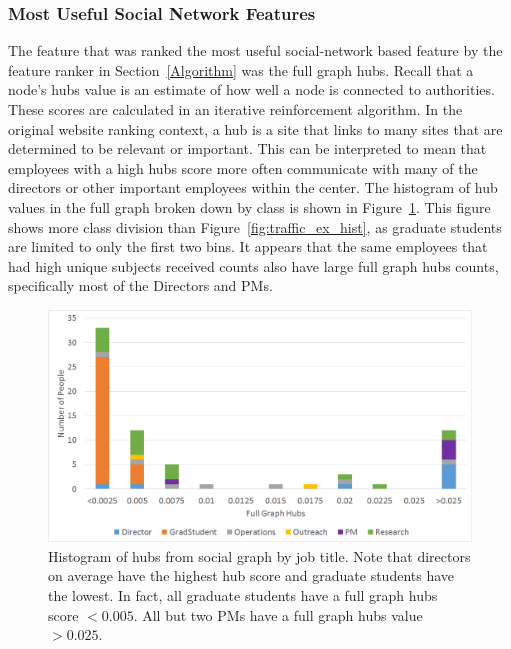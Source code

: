 \documentclass[12pt]{report}
\begin{document}
\subsubsection{Most Useful Social Network Features}
The feature that was ranked the most useful social-network based feature by the feature ranker in Section~\ref{Algorithm} was the full graph hubs.
Recall that a node's hubs value is an estimate of how well a node is connected to authorities.
These scores are calculated in an iterative reinforcement algorithm.
In the original website ranking context, a hub is a site that links to many sites that are determined to be relevant or important.
This can be interpreted to mean that employees with a high hubs score more often communicate with many of the directors or other important employees within the center.
The histogram of hub values in the full graph broken down by class is shown in Figure~\ref{fig:social_ex_hist}.
This figure shows more class division than Figure~\ref{fig:traffic_ex_hist}, as graduate students are limited to only the first two bins.
It appears that the same employees that had high unique subjects received counts also have large full graph hubs counts, specifically most of the Directors and PMs.

\begin{figure}[t]
    \centering
        \includegraphics[width=\columnwidth,trim={0mm 0mm 0mm 0mm},clip]{Hubs_hist}
        \vspace{-17pt}
        \caption[Histogram of the full graph hubs feature]{Histogram of hubs from social graph by job title.  Note that directors on average have the highest hub score and graduate students have the lowest.  In fact, all graduate students have a full graph hubs score $<0.005$.  All but two PMs have a full graph hubs value $>0.025$.}
        \label{fig:social_ex_hist}
\end{figure}
\end{document}
